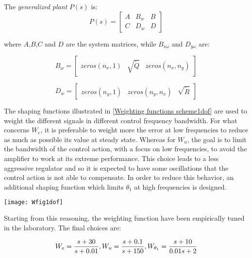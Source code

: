 The \textit{generalized plant} $P(s)$ is:
\begin{equation}
	P(s)
	=
	\left[
	\begin{array}{c|cc}
		A & B_{w} & B \\
		\hline
		C & D_{w} & D	
	\end{array}
	\right]
\label{P(s)}
\end{equation}

where $A$,$B$,$C$ and $D$ are the system matrices, while $B_{\dot{x}\omega}$ and $D_{y\omega}$ are:

\begin{equation}
	B_{w}=
	\begin{bmatrix}
		zeros(n_x,1) & \sqrt{\tilde{Q}} & zeros (n_x,n_y)
	\end{bmatrix}
\end{equation}

\begin{equation}
	D_{w}=
	\begin{bmatrix}
		zeros(n_y,1) & zeros (n_y,n_x) & \sqrt{\tilde{R}}
	\end{bmatrix}
\end{equation}

The shaping functions illustrated in \ref{Weighting functions scheme1dof} are used to weight the different signals in different control frequency bandwidth. 
For what concerns $W_e$, it is preferable to weight more the error at low frequencies to reduce as much as possible its value at steady state. Whereas for $W_u$, the goal is to limit the bandwidth of the control action, with a focus on low frequencies, to avoid the amplifier to  work at its extreme performance. This choice leads to a less aggressive regulator and so it is expected to have some oscillations that the control action is not able to compensate. In order to reduce this behavior, an additional shaping function which limits $\theta_{1}$ at high frequencies is designed.

\begin{figure*}[h]
	\centering
	\texttt{[image: Wfig1dof]}
	\caption{Weighting functions scheme}
	\label{Weighting functions scheme1dof}
\end{figure*}
Starting from this reasoning, the weighting function have been empirically tuned in the laboratory. The final choices are:

\begin{equation}
	W_e=
	\frac{s+30}{s+0.01}
	\\
	,
	\\
	W_u=
	\frac{s+0.1}{s+150}
	\\
	,
	\\
	W_{\theta_{1}}=
	\frac{s+10}{0.01s+2}
\end{equation}

